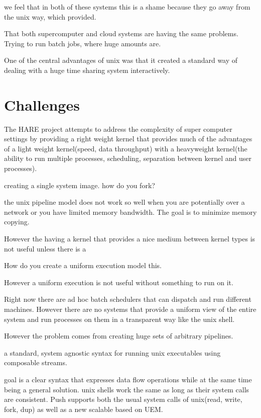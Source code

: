 \documentclass{sig-alt-release2}
\begin{document}
we feel that in both of these systems this is a shame because they go away from the unix way, which provided. 

That both supercomputer and cloud systems are having the same problems. Trying to run batch jobs, where huge amounts are. 

One of the central advantages of unix was that it created a standard way of dealing with a huge time sharing system interactively. 

\section{Challenges}

The HARE project attempts to address the complexity of super computer settings by providing a right weight kernel that provides much of the advantages of a light weight kernel(speed, data throughput) with a heavyweight kernel(the ability to run multiple processes, scheduling, separation between kernel and user processes). 

creating a single system image. how do you fork?  

the unix pipeline model does not work so well when you are potentially over a network or you have limited memory bandwidth. The goal is to minimize memory copying. 



However the having a kernel that provides a nice medium between kernel types is not useful unless there is a 

How do you create a uniform execution model this. 

However a uniform execution is not useful without something to run on it. 

Right now there are ad hoc batch schedulers that can dispatch and run different machines. However there are no systems that provide a uniform view of the entire system and run processes on them in a transparent way like the unix shell. 

However the problem comes from creating huge sets of arbitrary pipelines. 


a standard, system agnostic syntax for running unix executables using composable streams. 

goal is a clear syntax that expresses data flow operations while at the same time being a general solution. unix shells work the same as long as their system calls are consistent. Push supports both the usual system calls of unix(read, write, fork, dup) as well as a new scalable based on UEM. 
\end{document}
